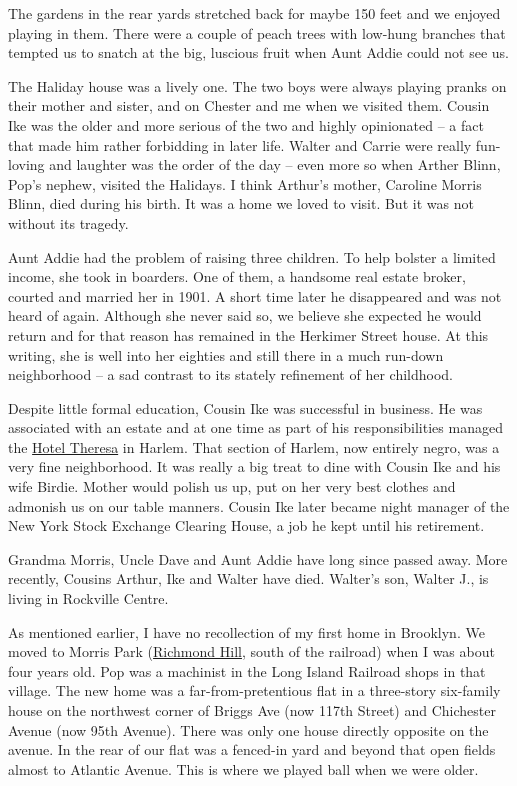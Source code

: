 \documentclass[12pt]{book}              %
\begin{document}
The gardens in the rear yards stretched back for maybe 150 feet and we enjoyed playing in them. There were a couple of peach trees with low-hung branches that tempted us to snatch at the big, luscious fruit when Aunt Addie could not see us. 

The Haliday house was a lively one. The two boys were always playing pranks on their mother and sister, and on Chester and me when we visited them. Cousin Ike was the older and more serious of the two and highly opinionated -- a fact that made him rather forbidding in later life. Walter and Carrie were really fun-loving and laughter was the order of the day -- even more so when Arther Blinn, Pop's nephew, visited the Halidays. I think Arthur's mother, Caroline Morris Blinn, died during his birth. It was a home we loved to visit. But it was not without its tragedy. 

Aunt Addie had the problem of raising three children. To help bolster a limited income, she took in boarders. One of them, a handsome real estate broker, courted and married her in 1901. A short time later he disappeared and was not heard of again. Although she never said so, we believe she expected he would return and for that reason has remained in the Herkimer Street house. At this writing, she is well into her eighties and still there in a much run-down neighborhood -- a sad contrast to its stately refinement of her childhood. 

Despite little formal education, Cousin Ike was successful in business. He was associated with an estate and at one time as part of his responsibilities managed the \href{http://en.wikipedia.org/wiki/Hotel_Theresa}{Hotel Theresa} in Harlem. That section of Harlem, now entirely negro, was a very fine neighborhood. It was really a big treat to dine with Cousin Ike and his wife Birdie. Mother would polish us up, put on her very best clothes and admonish us on our table manners. Cousin Ike later became night manager of the New York Stock Exchange Clearing House, a job he kept until his retirement. 

Grandma Morris, Uncle Dave and Aunt Addie have long since passed away. More recently, Cousins Arthur, Ike and Walter have died. Walter's son, Walter J., is living in Rockville Centre. 

As mentioned earlier, I have no recollection of my first home in Brooklyn. We moved to Morris Park (\href{http://en.wikipedia.org/wiki/Richmond_Hill,_Queens}{Richmond Hill}, south of the railroad) when I was about four years old. Pop was a machinist in the Long Island Railroad shops in that village. The new home was a far-from-pretentious flat in a three-story six-family house on the northwest corner of Briggs Ave (now 117th Street) and Chichester Avenue (now 95th Avenue). There was only one house directly opposite on the avenue. In the rear of our flat was a fenced-in yard and beyond that open fields almost to Atlantic Avenue. This is where we played ball when we were older. 
\end{document}
